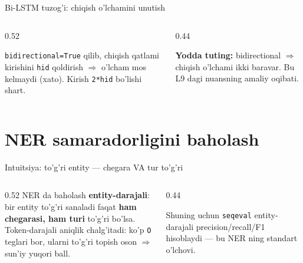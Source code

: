 \documentclass[aspectratio=169,11pt]{beamer}
\begin{document}
\begin{frame}{Bi-LSTM tuzog'i: chiqish o'lchamini unutish}
  \begin{columns}[T]
    \begin{column}{0.52\textwidth}
      \begin{tcolorbox}[warnbox,title=Eng tez-tez xato]
        \small
        \texttt{bidirectional=True} qilib, chiqish qatlami kirishini \texttt{hid}
        qoldirish $\Rightarrow$ o'lcham mos kelmaydi (xato). Kirish \texttt{2*hid}
        bo'lishi shart.
      \end{tcolorbox}
    \end{column}
    \begin{column}{0.44\textwidth}
      \begin{tcolorbox}[okbox,top=2pt,bottom=2pt]
        \footnotesize
        \textbf{Yodda tuting:} bidirectional $\Rightarrow$ chiqish o'lchami ikki
        baravar. Bu L9 dagi nuansning amaliy oqibati.
      \end{tcolorbox}
    \end{column}
  \end{columns}
\end{frame}

\section[Baholash]{NER samaradorligini baholash}

\begin{frame}{Intuitsiya: to'g'ri entity --- chegara VA tur to'g'ri}
  \begin{columns}[T]
    \begin{column}{0.52\textwidth}
      \small
      NER da baholash \textbf{entity-darajali}: bir entity to'g'ri sanaladi faqat
      \textbf{ham chegarasi, ham turi} to'g'ri bo'lsa.\\[6pt]
      Token-darajali aniqlik chalg'itadi: ko'p \texttt{O} teglari bor, ularni
      to'g'ri topish oson $\Rightarrow$ sun'iy yuqori ball.
    \end{column}
    \begin{column}{0.44\textwidth}
      \begin{tcolorbox}[okbox,top=2pt,bottom=2pt]
        \footnotesize
        Shuning uchun \texttt{seqeval} entity-darajali precision/recall/F1
        hisoblaydi --- bu NER ning standart o'lchovi.
      \end{tcolorbox}
    \end{column}
  \end{columns}
\end{frame}
\end{document}
